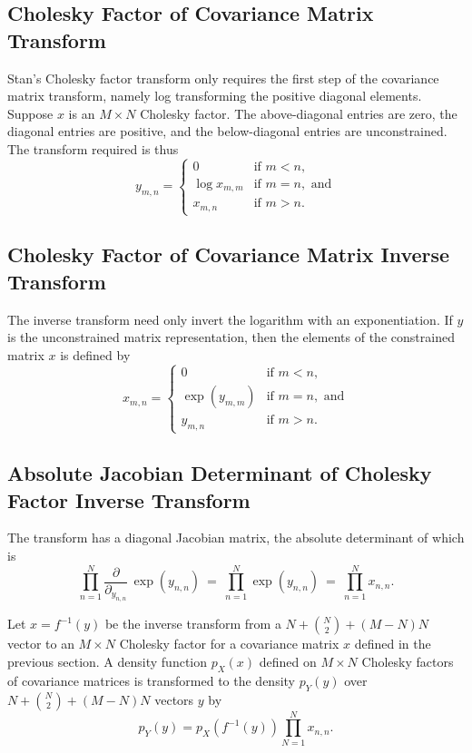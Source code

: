 \subsection{Cholesky Factor of Covariance Matrix Transform}

Stan's Cholesky factor transform only requires the first step of the
covariance matrix transform, namely log transforming the positive
diagonal elements.  Suppose $x$ is an $M \times N$ Cholesky factor.
The above-diagonal entries are zero, the diagonal entries are
positive, and the below-diagonal entries are unconstrained.  The
transform required is thus
%
\[
y_{m,n} =
\left\{
\begin{array}{cl}
0 & \mbox{if } m < n,
\\[4pt]
\log x_{m,m} & \mbox{if } m = n, \mbox{ and}
\\[4pt]
x_{m,n} & \mbox{if } m > n.
\end{array}
\right.
\]

\subsection{Cholesky Factor of Covariance Matrix Inverse Transform}

The inverse transform need only invert the logarithm with an
exponentiation.  If $y$ is the unconstrained matrix representation,
then the elements of the constrained matrix $x$ is defined by
\[
x_{m,n} =
\left\{
\begin{array}{cl}
0 & \mbox{if } m < n,
\\[4pt]
\exp(y_{m,m}) & \mbox{if } m = n, \mbox{ and}
\\[4pt]
y_{m,n} & \mbox{if } m > n.
\end{array}
\right.
\]

\subsection{Absolute Jacobian Determinant of Cholesky Factor Inverse Transform}

The transform has a diagonal Jacobian matrix, the absolute determinant
of which is
%
\[
\prod_{n=1}^N  \frac{\partial}{\partial_{y_{n,n}}} \, \exp(y_{n,n})
\ = \
\prod_{n=1}^N \exp(y_{n,n})
\ = \
\prod_{n=1}^N x_{n,n}.
\]

Let $x = f^{-1}(y)$ be the inverse transform from a $N + \binom{N}{2}
+ (M - N)N$ vector to an $M \times N$ Cholesky factor for a covariance
matrix $x$ defined in the previous section.  A density function
$p_X(x)$ defined on $M \times N$ Cholesky factors of covariance
matrices is transformed to the density $p_Y(y)$ over $N + \binom{N}{2}
+ (M - N)N$ vectors $y$ by
%
\[
p_Y(y) = p_X(f^{-1}(y)) \prod_{N=1}^N x_{n,n}.
\]

